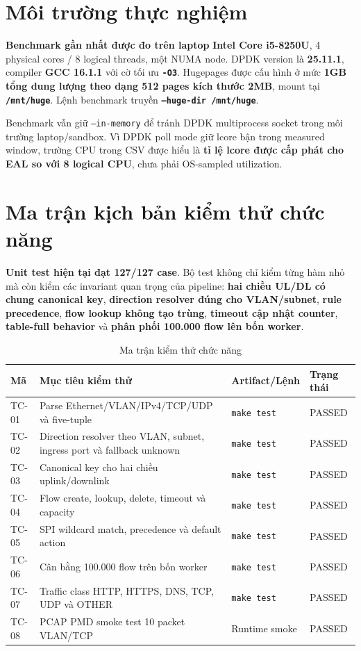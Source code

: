 \documentclass[12pt,a4paper,twoside]{report}
\newcommand{\code}[1]{\texttt{#1}}
\begin{document}
\section{Môi trường thực nghiệm}
\textbf{Benchmark gần nhất được đo trên laptop}
\textbf{Intel Core i5-8250U}, 4 physical cores / 8 logical threads, một NUMA
node. DPDK version là \textbf{25.11.1}, compiler \textbf{GCC 16.1.1} với cờ tối
ưu \textbf{\code{-O3}}. Hugepages được cấu hình ở mức \textbf{1GB tổng dung
lượng theo dạng 512 pages kích thước 2MB}, mount tại \textbf{\code{/mnt/huge}}.
Lệnh benchmark truyền \textbf{\code{--huge-dir /mnt/huge}}.

Benchmark vẫn giữ \code{--in-memory} để tránh DPDK multiprocess socket trong
môi trường laptop/sandbox. Vì DPDK poll mode giữ lcore bận trong
measured window, trường CPU trong CSV được hiểu là \textbf{tỉ lệ lcore được cấp
phát cho EAL so với 8 logical CPU}, chưa phải OS-sampled utilization.

\section{Ma trận kịch bản kiểm thử chức năng}
\textbf{Unit test hiện tại đạt 127/127 case}. Bộ test không chỉ kiểm từng hàm
nhỏ mà còn kiểm các invariant quan trọng của pipeline: \textbf{hai chiều UL/DL
có chung canonical key}, \textbf{direction resolver đúng cho VLAN/subnet},
\textbf{rule precedence}, \textbf{flow lookup không tạo trùng}, \textbf{timeout
cập nhật counter}, \textbf{table-full behavior} và \textbf{phân phối 100.000
flow lên bốn worker}.

\begin{table}[H]
    \centering
    \caption{Ma trận kiểm thử chức năng}
    \label{tab:test_matrix}
    \small
    \setlength{\tabcolsep}{4pt}
    \renewcommand{\arraystretch}{1.16}
    \begin{tabular}{C{1.35cm} L{6.25cm} L{3.0cm} C{2.05cm}}
        \toprule
        \textbf{Mã} & \textbf{Mục tiêu kiểm thử} & \textbf{Artifact/Lệnh} & \textbf{Trạng thái} \\
        \midrule
        TC-01 & Parse Ethernet/VLAN/IPv4/TCP/UDP và five-tuple & \code{make test} & PASSED \\
        TC-02 & Direction resolver theo VLAN, subnet, ingress port và fallback unknown & \code{make test} & PASSED \\
        TC-03 & Canonical key cho hai chiều uplink/downlink & \code{make test} & PASSED \\
        TC-04 & Flow create, lookup, delete, timeout và capacity & \code{make test} & PASSED \\
        TC-05 & SPI wildcard match, precedence và default action & \code{make test} & PASSED \\
        TC-06 & Cân bằng 100.000 flow trên bốn worker & \code{make test} & PASSED \\
        TC-07 & Traffic class HTTP, HTTPS, DNS, TCP, UDP và OTHER & \code{make test} & PASSED \\
        TC-08 & PCAP PMD smoke test 10 packet VLAN/TCP & Runtime smoke & PASSED \\
        \bottomrule
    \end{tabular}
\end{table}
\end{document}
